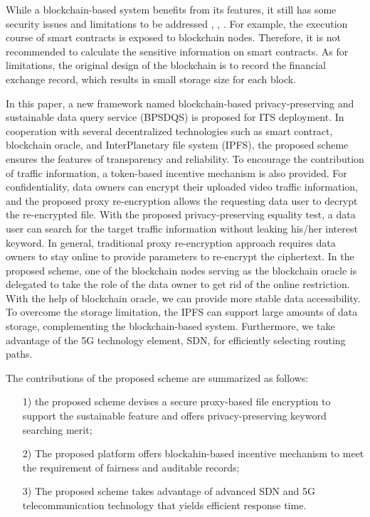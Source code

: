 \documentclass[journal]{IEEEtran}
\begin{document}
    While a blockchain-based system benefits from its features, it still has some security issues and limitations to be addressed \cite{aso2017}, \cite{abc2019}, \cite{rbf2019}. For example, the execution course of smart contracts is exposed to blockchain nodes. Therefore, it is not recommended to calculate the sensitive information on smart contracts. As for limitations, the original design of the blockchain is to record the financial exchange record, which results in small storage size for each block.    

    In this paper, a new framework named blockchain-based privacy-preserving and sustainable data query service (BPSDQS) is proposed for ITS deployment. In cooperation with several decentralized technologies such as smart contract, blockchain oracle, and InterPlanetary file system (IPFS), the proposed scheme ensures the features of transparency and reliability. To encourage the contribution of traffic information, a token-based incentive mechanism is also provided. For confidentiality, data owners can encrypt their uploaded video traffic information, and the proposed proxy re-encryption allows the requesting data user to decrypt the re-encrypted file. With the proposed privacy-preserving equality test, a data user can search for the target traffic information without leaking his/her interest keyword. In general, traditional proxy re-encryption approach requires data owners to stay online to provide parameters to re-encrypt the ciphertext. In the proposed scheme, one of the blockchain nodes serving as the blockchain oracle is delegated to take the role of the data owner to get rid of the online restriction. With the help of blockchain oracle, we can provide more stable data accessibility. To overcome the storage limitation, the IPFS can support large amounts of data storage, complementing the blockchain-based system. Furthermore, we take advantage of the 5G technology element, SDN, for efficiently selecting routing paths. 

    The contributions of the proposed scheme are summarized as follows:
    
\begin{itemize}
\item [1)]
    the proposed scheme devises a secure proxy-based file encryption to support the sustainable feature and offers privacy-preserving keyword searching merit; 
\item [2)]
    The proposed platform offers blockahin-based incentive mechanism to meet the requirement of fairness and auditable records; 
\item [3)]
    The proposed scheme takes advantage of advanced SDN and 5G telecommunication technology that yields efficient response time. 
\end{itemize}
\end{document}
